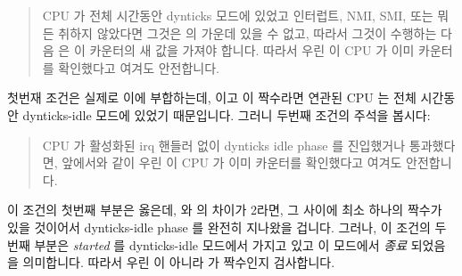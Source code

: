 \begin{quote}
	CPU 가 전체 시간동안 dynticks 모드에 있었고 인터럽트, NMI, SMI, 또는
	뭐든 취하지 않았다면 그것은  의 가운데 있을 수
	없고, 따라서 그것이 수행하는 다음  은 이 카운터의
	새 값을 가져야 합니다.  따라서 우린 이 CPU 가 이미 카운터를 확인했다고
	여겨도 안전합니다.

	\iffalse

	If the CPU remained in dynticks mode for the entire time
	and didn't take any interrupts, NMIs, SMIs, or whatever,
	then it cannot be in the middle of an \co{rcu_read_lock()}, so
	the next \co{rcu_read_lock()} it executes must use the new value
	of the counter.  So we can safely pretend that this CPU
	already acknowledged the counter.

	\fi

\end{quote}

첫번재 조건은 실제로 이에 부합하는데,  이고  이
짝수라면 연관된 CPU 는 전체 시간동안 dynticks-idle 모드에 있었기 때문입니다.
그러니 두번째 조건의 주석을 봅시다:

\iffalse

The first condition does match this, because if \qco{curr == snap}
and if \co{curr} is even, then the corresponding CPU has been
in dynticks-idle mode the entire time, as required.
So let's look at the comment block for the second condition:

\fi

\begin{quote}
	CPU 가 활성화된 irq 핸들러 없이 dynticks idle phase 를 진입했거나
	통과했다면, 앞에서와 같이 우린 이 CPU 가 이미 카운터를 확인했다고
	여겨도 안전합니다.

	\iffalse

	If the CPU passed through or entered a dynticks idle phase with
	no active irq handlers, then, as above, we can safely pretend
	that this CPU already acknowledged the counter.

	\fi

\end{quote}

이 조건의 첫번째 부분은 옳은데,  와  의 차이가 2라면, 그
사이에 최소 하나의 짝수가 있을 것이어서 dynticks-idle phase 를 완전히 지나왔을
겁니다.
그러나, 이 조건의 두번째 부분은 \emph{started} 를 dynticks-idle 모드에서 가지고
있고 이 모드에서 \emph{종료} 되었음을 의미합니다.
따라서 우린  이 아니라  가 짝수인지 검사합니다.


